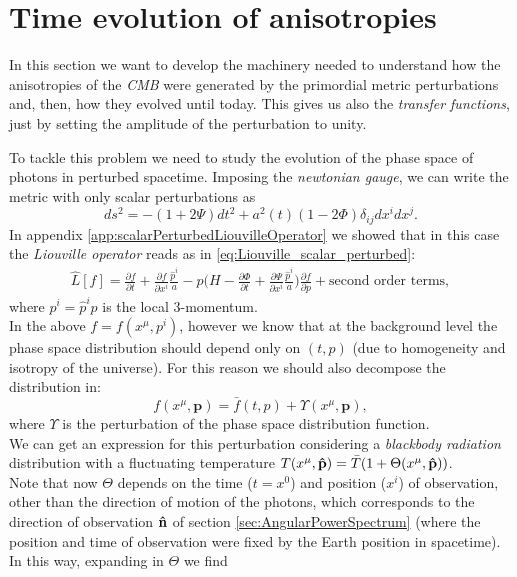 \section{Time evolution of anisotropies}\label{sec:ThetaTimeEvolution}
In this section we want to develop the machinery needed to understand how the anisotropies of the \emph{CMB} were generated by the primordial metric perturbations and, then, how they evolved until today. This gives us also the \emph{transfer functions}, just by setting the amplitude of the perturbation to unity.

To tackle this problem we need to study the evolution of the phase space of photons in perturbed spacetime. Imposing the \emph{newtonian gauge}, we can write the metric with only scalar perturbations as
$$ds^2 = -(1+2\Psi)dt^2 + a^2(t)(1-2\Phi)\delta_{ij}dx^idx^j.$$
In appendix \ref{app:scalarPerturbedLiouvilleOperator} we showed that in this case the \emph{Liouville operator} reads as in \eqref{eq:Liouville_scalar_perturbed}:
\begin{align*}
    \hat{L}[f]=\frac{\partial f}{\partial t}+\frac{\partial f}{\partial x^i}\frac{\hat p^i}{a}-p\bigg(H-\frac{\partial \Phi}{\partial t}+\frac{\partial \Psi}{\partial x^i}\frac{\hat p^i}{a}\bigg)\frac{\partial f}{\partial p}+\text{second order terms},
\end{align*}
where $p^i=\hat p^i p$ is the local 3-momentum.\\In the above $f=f(x^\mu,p^i)$, however we know that at the background level the phase space distribution should depend only on $(t,p)$ (due to homogeneity and isotropy of the universe). For this reason we should also decompose the distribution in:
\begin{equation}\label{eq:phspdist_perturb}
    f(x^\mu,\mathbf p) = \bar f(t,p) + \Upsilon (x^\mu,\mathbf{p}),
\end{equation}
where $\Upsilon$ is the perturbation of the phase space distribution function.\\
We can get an expression for this perturbation considering a \emph{blackbody radiation} distribution with a fluctuating temperature $T(x^\mu,\mathbf{\hat{p}})=\bar T (1+\Theta(x^\mu,\mathbf{\hat{p}}))$.\\ Note that now $\Theta$ depends on the time ($t=x^0$) and position ($x^i$) of observation, other than the direction of motion of the photons, which corresponds to the direction of observation $\mathbf{\hat{n}}$ of section \ref{sec:AngularPowerSpectrum} (where the position and time of observation were fixed by the Earth position in spacetime). In this way, expanding in $\Theta$ we find
